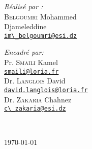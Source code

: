 {\begin{titlepage}
  \vspace{10mm}

  \noindent
  \begin{minipage}{0.6\textwidth}
    \vspace{-7mm}
    \begin{flushleft} \large
      \emph{Réalisé par :}\\
      \textsc{Belgoumri} Mohammed \\Djameleddine\\
      \href{mailto:im_belgoumri@esi.dz}{\verb!im\_belgoumri@esi.dz!}  
    \end{flushleft}
  \end{minipage}
  \begin{minipage}{0.35\textwidth}
    \begin{flushright} \large
      \begin{flushleft} \large
      \emph{Encadré par:} \\
      {
        Pr. \textsc{Smaili} Kamel\\[0.1cm]
        \href{mailto:smaili@loria.fr}{\verb!smaili@loria.fr!}\\[0.1cm]
        Dr. \textsc{Langlois} David\\[0.1cm]
        \href{mailto:david.langlois@loria.fr}{\verb!david.langlois@loria.fr!}\\[0.1cm]
        Dr. \textsc{Zakaria} Chahnez\\[0.1cm]
        \href{mailto:c_zakaria@esi.dz}{\verb!c\_zakaria@esi.dz!}\\
      }
      \end{flushleft}
    \end{flushright}
  \end{minipage}\\[1cm]

  \vfill

  {\large \today}        
\end{titlepage}
\restoregeometry
}